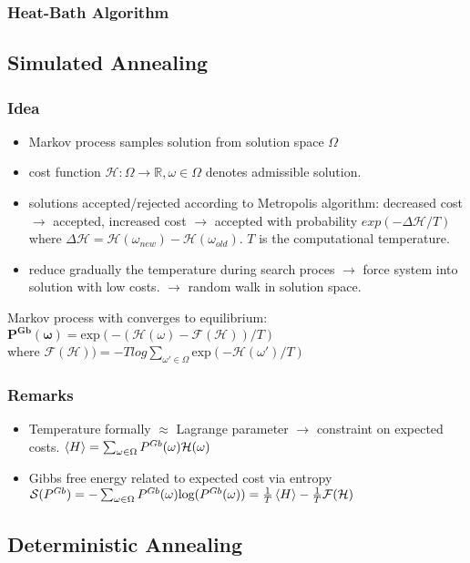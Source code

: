\documentclass[9pt,parskip]{scrartcl}
\begin{document}
\begin{multicols*}{4}
\subsubsection*{Heat-Bath Algorithm}

\subsection*{Simulated Annealing}
\subsubsection*{Idea}
\begin{itemize}
	\item Markov process samples solution from solution space $\Omega$
	\item cost function $\mathcal{H}: \Omega \to \mathbb{R}, \omega \in \Omega$ denotes admissible solution.
	\item solutions accepted/rejected according to Metropolis algorithm: decreased cost $\to$ accepted, increased cost $\to$ accepted with probability $exp(- \Delta \mathcal{H}/T)$ where $\Delta \mathcal{H} = \mathcal{H}(\omega_{new}) - \mathcal{H}(\omega_{old}) $. $T$ is the computational temperature.
	\item reduce gradually the temperature during search proces $\to$ force system into solution with low costs. $\to$ random walk in solution space.
\end{itemize}
Markov process with converges to equilibrium: \\
$\mathbf{P^{Gb}(\omega)} = \text{exp}(-(\mathcal{H}(\omega) - \mathcal{F}(\mathcal{H}))/T )$ \\
where $\mathcal{F}(\mathcal{H})) = -T log \sum_{\omega' \in \Omega} \text{exp}(-\mathcal{H}(\omega')/T )$
\subsubsection*{Remarks}
\begin{itemize}
	\item Temperature formally $\approx$ Lagrange parameter $\to$ constraint on expected costs. $\braket{H} = \sum_{\omega \in \Omega} P^{Gb}(\omega)  \mathcal{H}(\omega)$
	\item Gibbs free energy related to expected cost via entropy $\mathcal{S}(P^{Gb}) = -\sum_{\omega \in \Omega} P^{Gb}(\omega)  \text{log} (P^{Gb}(\omega) ) = \frac 1 T \braket{H} - \frac 1 T \mathcal{F}(\mathcal{H})$
\end{itemize}
\subsection*{Deterministic Annealing}

\end{multicols*}
\end{document}
